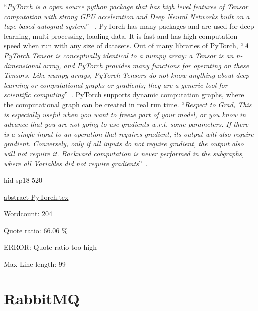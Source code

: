 \color{blue}``\emph{PyTorch is a open source python package that has high level features of 
Tensor computation with strong GPU acceleration and Deep 
Neural Networks built on a tape-based autograd system}''\color{black}
~\cite{hid-sp18-520-PyTorch}.
PyTorch has many packages and are used for deep learning, multi processing,
loading data. It is fast and has high computation speed when run with any size 
of datasets.
Out of many libraries of PyTorch, \color{blue}``\emph{A PyTorch Tensor is conceptually identical 
to a numpy array: a Tensor is an n-dimensional array, and PyTorch provides many
functions for operating on these Tensors. Like numpy arrays, PyTorch Tensors do 
not know anything about deep learning or computational graphs or gradients; they
are a generic tool for scientific computing}''\color{black}~\cite{hid-sp18-520-PyTorchtensor}.
PyTorch supports dynamic computation graphs, where the computational graph can 
be created in real run time.
\color{blue}``\emph{Respect to Grad, This is especially useful when you want to freeze part of your
model, or you know in advance that you are not going to use gradients w.r.t. 
some parameters. If there is a single input to an operation that requires 
gradient, its output will also require gradient. Conversely, only if all inputs 
do not require gradient, the output also will not require it. Backward 
computation is never performed in the subgraphs, where all Variables did not 
require gradients}''\color{black}~\cite{hid-sp18-520-PyTorchgrad}.


\begin{IU}

hid-sp18-520

\href{https://github.com/cloudmesh-community/hid-sp18-520/blob/master//technology/abstract-PyTorch.tex}{abstract-PyTorch.tex}

 

Wordcount: 204


Quote ratio: 66.06 \%

ERROR: Quote ratio too high
 
Max Line length: 99
\end{IU}

\section{RabbitMQ}

